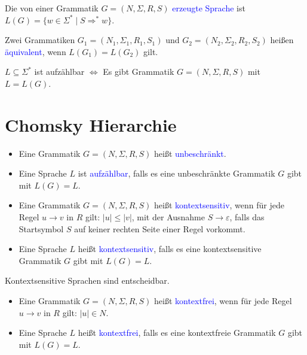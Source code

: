 \documentclass{scrreprt}
\begin{document}
\begin{Definition}
Die von einer Grammatik $G=(N,\Sigma,R,S)$ \textcolor{blue}{erzeugte Sprache} ist $L(G)=\{w\in \Sigma^* \mid S \Rightarrow^* w\}$.
\end{Definition}

\begin{Definition}
Zwei Grammatiken $G_1=(N_1,\Sigma_1,R_1,S_1)$ und $G_2=(N_2,\Sigma_2,R_2,S_2)$ heißen \textcolor{blue}{äquivalent}, wenn $L(G_1)=L(G_2)$ gilt.
\end{Definition}

\begin{Satz}
$L\subseteq\Sigma^*$ ist aufzählbar $\Leftrightarrow$ Es gibt Grammatik $G=(N,\Sigma,R,S)$ mit $L = L(G)$.
\end{Satz}

\section{Chomsky Hierarchie}
\begin{Definition}
\noindent
\begin{itemize}
\item
Eine Grammatik $G=(N,\Sigma,R,S)$ heißt \textcolor{blue}{unbeschränkt}.
\item
Eine Sprache $L$ ist \textcolor{blue}{aufzählbar}, falls es eine unbeschränkte Grammatik $G$ gibt mit $L(G)=L$.
\end{itemize}
\end{Definition}

\begin{Definition}
\noindent
\begin{itemize}
\item
Eine Grammatik $G=(N,\Sigma,R,S)$ heißt \textcolor{blue}{kontextsensitiv}, wenn für jede Regel $u\rightarrow v$ in $R$ gilt: $|u| \leq |v|$, mit der Ausnahme $S \rightarrow \varepsilon$, falls das Startsymbol $S$ auf keiner rechten Seite einer Regel vorkommt.
\item
Eine Sprache $L$ heißt \textcolor{blue}{kontextsensitiv}, falls es eine kontextsensitive Grammatik $G$ gibt mit $L(G)=L$.
\end{itemize}
\end{Definition}

\begin{Satz}
Kontextsensitive Sprachen sind entscheidbar.
\end{Satz}

\begin{Definition}
\noindent
\begin{itemize}
\item
Eine Grammatik $G=(N,\Sigma,R,S)$ heißt \textcolor{blue}{kontextfrei}, wenn für jede Regel $u\rightarrow v$ in $R$ gilt: $|u| \in N$.
\item
Eine Sprache $L$ heißt \textcolor{blue}{kontextfrei}, falls es eine kontextfreie Grammatik $G$ gibt mit $L(G)=L$.
\end{itemize}
\end{Definition}
\end{document}
